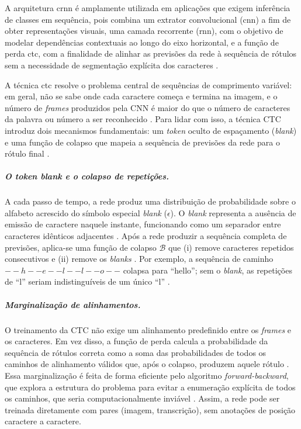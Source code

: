 A arquitetura \gls{crnn} é amplamente utilizada em aplicações que exigem 
inferência de classes em sequência, 
pois combina um extrator convolucional (\gls{cnn}) 
a fim de obter representações visuais, 
uma camada recorrente (\gls{rnn}), com o objetivo de modelar dependências contextuais ao longo do eixo horizontal, 
e a função de perda \gls{ctc}, com a finalidade de alinhar as previsões da rede à sequência de rótulos sem a necessidade de 
segmentação explícita dos caracteres \cite{shi2017crnn}.

A técnica \gls{ctc} resolve o problema central de sequências de comprimento variável: 
em geral, não se sabe onde cada caractere começa e termina na imagem, 
e o número de \textit{frames} produzidos pela CNN é maior do que o número de caracteres 
da palavra ou número a ser reconhecido \cite{graves2006ctc}. 
Para lidar com isso, a técnica CTC introduz dois mecanismos fundamentais: 
um \textit{token} oculto de espaçamento (\textit{blank}) e uma 
função de colapso que mapeia a sequência de previsões da rede 
para o rótulo final \cite{graves2006ctc, hannun2017ctc}.

\subparagraph{O \textit{token} \textit{blank} e o colapso de repetições.}
A cada passo de tempo, 
a rede produz uma distribuição de probabilidade sobre o alfabeto 
acrescido do símbolo especial \textit{blank} (\(\epsilon\)). 
O \textit{blank} representa a ausência de emissão de caractere naquele instante, 
funcionando como um separador entre caracteres idênticos adjacentes 
\cite{graves2006ctc}. 
Após a rede produzir a sequência completa de previsões, 
aplica-se uma função de colapso \(\mathcal{B}\) 
que (i) remove caracteres repetidos consecutivos e 
(ii) remove os \textit{blanks} \cite{hannun2017ctc}. 
Por exemplo, a sequência de caminho \(--h--e--l--l--o--\) colapsa 
para \(\text{``hello''}\); 
sem o \textit{blank}, as repetições de ``l'' seriam indistinguíveis de 
um único ``l'' \cite{hannun2017ctc}.

\subparagraph{Marginalização de alinhamentos.}
O treinamento da CTC não exige um alinhamento predefinido entre 
os \textit{frames} e os caracteres. Em vez disso, 
a função de perda calcula a probabilidade da sequência de rótulos correta como 
a soma das probabilidades de todos os caminhos de alinhamento válidos que, após o colapso, 
produzem aquele rótulo \cite{graves2006ctc}. 
Essa marginalização é feita de forma eficiente pelo algoritmo \textit{forward-backward}, 
que explora a estrutura do problema para evitar a 
enumeração explícita de todos os caminhos, 
que seria computacionalmente inviável \cite{graves2006ctc, hannun2017ctc}. 
Assim, a rede pode ser treinada diretamente com pares (imagem, transcrição), 
sem anotações de posição caractere a caractere.

